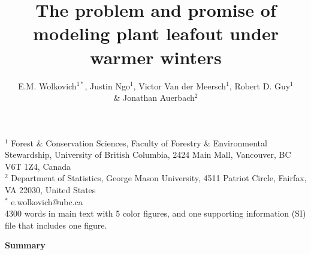 \documentclass[11pt]{article}
\begin{document}
\renewcommand{\refname}{\CHead{}}


\title{The problem and promise of \\ modeling plant leafout under warmer winters} %
\author{E.M. Wolkovich$^{1*}$, Justin Ngo$^1$, Victor Van der Meersch$^1$, Robert D. Guy$^1$ \\ \& Jonathan Auerbach$^2$} %
\maketitle


$^1$ Forest \& Conservation Sciences, Faculty of Forestry \& Environmental Stewardship, University of British Columbia, 2424 Main Mall, Vancouver, BC V6T 1Z4, Canada\\
$^2$ Department of Statistics, George Mason University, 4511 Patriot Circle, Fairfax, VA 22030, United States\\
$^*$ e.wolkovich@ubc.ca\\

4300 words in main text with 5 color figures, and one supporting information (SI) file that includes one figure. 

\newpage
\linenumbers
\begin{center}
{\bf Summary}
\end{center}
\end{document}
